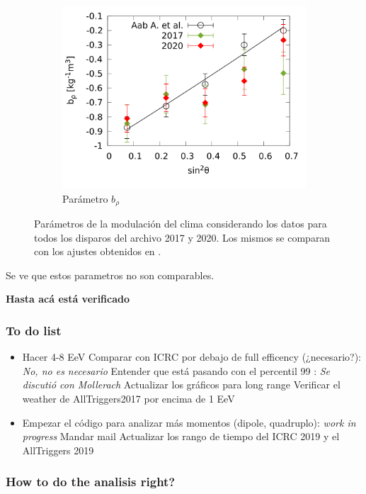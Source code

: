 \begin{figure}[H]
\begin{subfigure}[b]{\textwidth}
					\centering
					\includegraphics[width=0.5\linewidth]{../Anisotropia/params/brho_2017_2020_above_1EeV.png}
					\caption{Parámetro  $b_\rho$	 }
					\end{subfigure}%
					\caption{Parámetros de la modulación del clima considerando los datos para todos los disparos del archivo 2017 y 2020. Los mismos se comparan con los ajustes obtenidos en \cite{aab2017impact}.}
				\end{figure}

			Se ve que estos parametros no son comparables. 

{\bf Hasta acá está verificado}


\subsubsection*{To do list }
		\begin{itemize}
			\done (DONE) ¿estoy haciendo bien la cuenta? 
			\done (DONE) el log en ln o log10 para cpp? es ln==log en cpp
			\done¿Hay algo en la aproximación de rayleigh que se pasó por alto? Sigo buscando
			\done (DONE?) ¿Entiendo bien la approx? --Creo que sí, leí el paper que referencian, pero puede que un detalle se me halla escapado
	\item Hacer 4-8 EeV
	\done Comparar con ICRC por debajo de full efficency (¿necesario?): {\sl No, no es necesario}
	\done Entender que está pasando con el percentil 99 : {\sl Se discutió con Mollerach}
	 Actualizar los gráficos para long range 
	 Verificar el weather de AllTriggers2017 por encima de 1 EeV
	\item Empezar el código para analizar más momentos (dipole, quadruplo): {\sl work in progress}
	 Mandar mail
	\done Actualizar los rango de tiempo del ICRC 2019 y el AllTriggers 2019
\end{itemize}



\subsubsection*{How to do the analisis right?}


